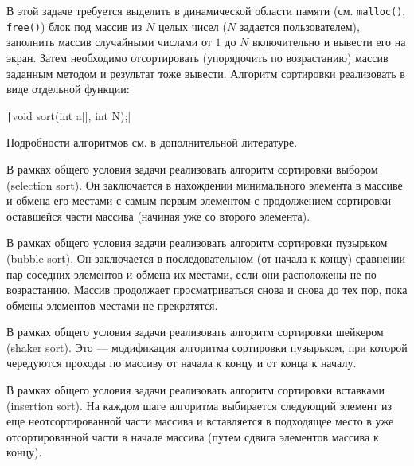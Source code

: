
В этой задаче требуется выделить в динамической области памяти 
(см. \texttt{malloc()}, \texttt{free()}) блок под 
массив из $N$ целых чисел ($N$ задается пользователем), заполнить массив
случайными числами от $1$ до $N$ включительно и вывести его на экран. Затем 
необходимо отсортировать (упорядочить по возрастанию) массив заданным методом 
и результат тоже вывести. Алгоритм сортировки реализовать в виде отдельной функции:

\texttt|void sort(int a[], int N);|

Подробности алгоритмов см. в дополнительной литературе.

\begin{zztask}
В рамках общего условия задачи реализовать алгоритм 
сортировки выбором (selection sort). Он заключается в нахождении минимального элемента
в массиве и обмена его местами с самым первым элементом с продолжением сортировки оставшейся
части массива (начиная уже со второго элемента).
\end{zztask}

\begin{zztask}
В рамках общего условия задачи реализовать алгоритм 
сортировки пузырьком (bubble sort). Он заключается в последовательном (от начала к концу)
сравнении пар соседних элементов и обмена их местами, если они расположены 
не по возрастанию. Массив продолжает просматриваться снова и снова до 
тех пор, пока обмены элементов местами не прекратятся.
\end{zztask}

\begin{zztask}
В рамках общего условия задачи реализовать алгоритм 
сортировки шейкером (shaker sort). Это --- модификация алгоритма сортировки пузырьком,
при которой чередуются проходы по массиву от начала к концу и от конца к началу.
\end{zztask}

\begin{zztask}
В рамках общего условия задачи реализовать алгоритм 
сортировки вставками (insertion sort). На каждом шаге алгоритма выбирается следующий 
элемент из еще неотсортированной части массива и вставляется в подходящее место в уже 
отсортированной части в начале массива (путем сдвига элементов массива к концу).
\end{zztask}

